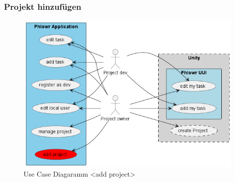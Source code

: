 \subsubsection{Projekt hinzufügen}
\begin{figure}[H]
  \begin{center}
    \includegraphics[width=0.3\linewidth]{../content/diagrams/usecase/overview/overviewUseCaseAddProjectSelected.png}
    \caption{Use Case Diagaramm <add project> }
  \end{center}
\end{figure}


